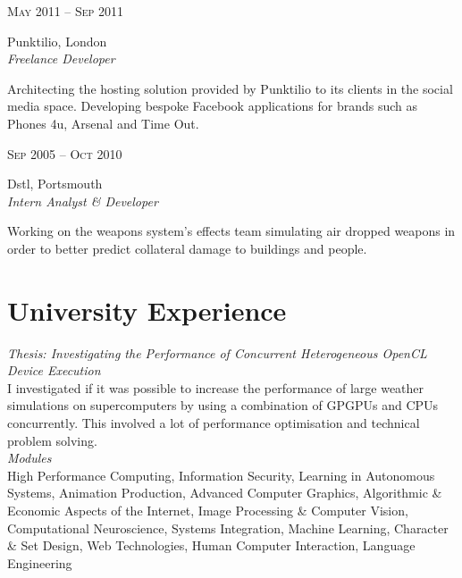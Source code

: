 \documentclass[10pt]{article} %
\begin{document}
{\begin{minipage}[t]{0.5\textwidth}
{\raggedleft\textsc{May 2011 -- Sep 2011}\par}

{\raggedright\large Punktilio, London\\
\textit{Freelance Developer}\\[5pt]}

\normalsize{
Architecting the hosting solution provided by Punktilio to its clients in the social media space. Developing bespoke Facebook applications for brands such as Phones 4u, Arsenal and Time Out.}\\

{\raggedleft\textsc{Sep 2005 -- Oct 2010}\par}

{\raggedright\large Dstl, Portsmouth\\
\textit{Intern Analyst \& Developer}\\[5pt]}

\normalsize{Working on the weapons system's effects team simulating air dropped weapons in order to better predict collateral damage to buildings and people.}\\

\section{University Experience}
{\textit{Thesis: Investigating the Performance of Concurrent Heterogeneous OpenCL Device Execution}}\\
\normalsize{I investigated if it was possible to increase the performance of large weather simulations on supercomputers by using a combination of GPGPUs and CPUs concurrently. This involved a lot of performance optimisation and technical problem solving.}\\

{\textit{Modules}}\\
\normalsize{High Performance Computing, Information Security, Learning in Autonomous Systems, Animation Production, Advanced Computer Graphics, Algorithmic \& Economic Aspects of the Internet, Image Processing \& Computer Vision, Computational Neuroscience, Systems Integration, Machine Learning, Character \& Set Design, Web Technologies, Human Computer Interaction, Language Engineering}

\end{minipage} %
\hfill
\begin{minipage}[t]{0.44\textwidth} 
\vspace{0pt} %


\end{minipage}}
\end{document}
